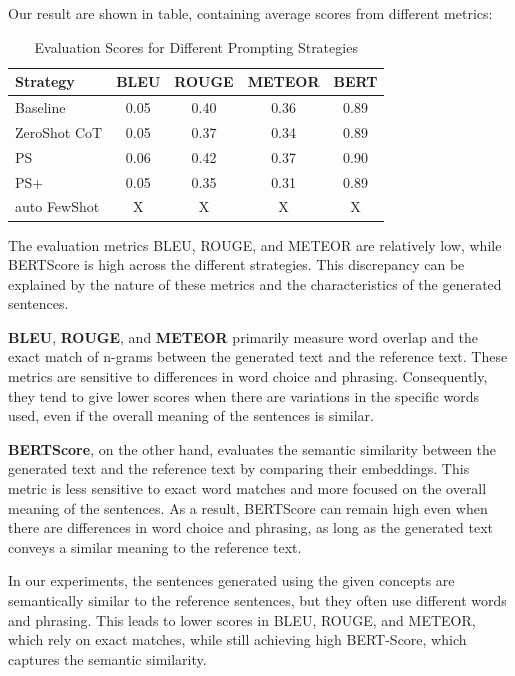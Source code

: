 \documentclass[fleqn,moreauthors,10pt]{ds_report}
\begin{document}
Our result are shown in table, containing average scores from different metrics:
\begin{table}[h!]
\centering

\begin{tabular}{lcccc}
\toprule
\textbf{Strategy} & \textbf{BLEU} & \textbf{ROUGE} & \textbf{METEOR} & \textbf{BERT} \\
\midrule
Baseline & 0.05 & 0.40 & 0.36 & 0.89 \\
ZeroShot CoT & 0.05 & 0.37 & 0.34 & 0.89 \\
PS & 0.06 & 0.42 & 0.37 & 0.90 \\
PS+ & 0.05 & 0.35 & 0.31 & 0.89 \\
auto FewShot & X & X & X & X \\
\bottomrule
\end{tabular}
\caption{Evaluation Scores for Different Prompting Strategies}
\label{tab:scores}
\end{table}
\newline
The evaluation metrics BLEU, ROUGE, and METEOR are relatively low, while BERTScore is high across the different strategies. This discrepancy can be explained by the nature of these metrics and the characteristics of the generated sentences.

\textbf{BLEU}, \textbf{ROUGE}, and \textbf{METEOR} primarily measure word overlap and the exact match of n-grams between the generated text and the reference text. These metrics are sensitive to differences in word choice and phrasing. Consequently, they tend to give lower scores when there are variations in the specific words used, even if the overall meaning of the sentences is similar.

\textbf{BERTScore}, on the other hand, evaluates the semantic similarity between the generated text and the reference text by comparing their embeddings. This metric is less sensitive to exact word matches and more focused on the overall meaning of the sentences. As a result, BERTScore can remain high even when there are differences in word choice and phrasing, as long as the generated text conveys a similar meaning to the reference text.

In our experiments, the sentences generated using the given concepts are semantically similar to the reference sentences, but they often use different words and phrasing. This leads to lower scores in BLEU, ROUGE, and METEOR, which rely on exact matches, while still achieving high BERT-Score, which captures the semantic similarity.
\end{document}
